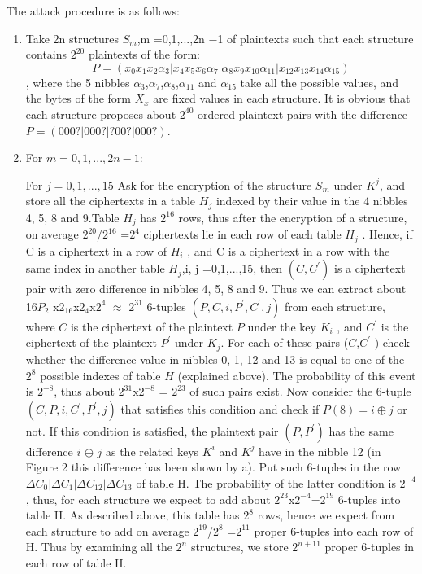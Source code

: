 \documentclass{transcrypto}
\begin{document}
	The attack procedure is as follows:
	\begin{enumerate}
		
	
	\item Take 2n structures $S_m$,m =0,1,...,2n −1 of plaintexts such that each structure contains $2^{20}$ plaintexts of the form: $$P =(x_0x_1x_2 \alpha _3|x_4x_5x_6\alpha _7|\alpha _8x_9x_{10}\alpha _{11}|x_{12}x_{13}x_{14}\alpha _{15})$$, where the 5 nibbles $\alpha_3$,$\alpha_7$,$\alpha_8$,$\alpha_{11}$ and $\alpha_{15}$ take all the possible values, and the bytes of the form $X_x$ are fixed values in each structure. It is obvious that each structure proposes about $2^{40}$ ordered plaintext pairs with the difference $P =(000?|000?|?00?|000?)$.
	\item For $m = 0,1,...,2n -1$: 
	
	For $j =0,1,...,15$ Ask for the encryption of the structure $S_m$ under $K^j$, and store all the ciphertexts in a table $H_j$ indexed by their value in the 4 nibbles 4, 5, 8 and 9.Table $H_j$ has $2^{16}$ rows, thus after the encryption of a structure, on average $2^{20}$/$2^{16}$ =$2^4$ ciphertexts lie in each row of each table $H_j$ . Hence, if C is a ciphertext in a row of $H_i$ , and C is a ciphertext in a row with the same index in another table $H_j$,i, j =0,1,...,15, then $(C,C^{'})$ is a ciphertext pair with zero difference in nibbles 4, 5, 8 and 9. Thus we can extract about 16$P_2$ x$2_{16}$x$2_4$x$2^4$ $\approx$ $2^{31}$ 6-tuples $(P, C, i, P^{'}, C^{'}, j)$ from each structure, where $C$ is the ciphertext of the plaintext $P$ under the key $K_i$ , and $C^{'}$ is the ciphertext of the plaintext $P^{'}$ under $K_j$. For each of these pairs ($C$,$C^{'}$ ) check whether the difference value in nibbles 0, 1, 12 and 13 is equal to one of the $2^8$ possible indexes of table $H$ (explained above). The probability of this event is $2^{-8}$, thus about $2^31$x$2^{−8}$ = $2^{23}$ of such pairs exist. Now consider the 6-tuple $(C, P, i, C^{'}, P^{'}, j)$ that satisfies this condition and check if $P(8) =i \oplus j$ or not. If this condition is satisfied, the plaintext pair $(P, P^{'})$ has the same difference $i$ $\oplus$ $j$ as the related keys $K^i$ and $K^j$ have in the nibble 12 (in Figure 2 this difference has been shown by a). Put such 6-tuples in the row $\Delta C_0|\Delta C_1|\Delta C_{12}|\Delta C_{13}$ of table H. The probability of the latter condition is $2^{-4}$, thus, for each structure we expect to add about $2^{23}$x$2^{-4}$=$2^{19}$ 6-tuples into table H. As described above, this table has $2^8$ rows, hence we expect from each structure to add on average $2^{19}$/$2^8$ =$2^{11}$ proper 6-tuples into each row of H. Thus by examining all the $2^n$ structures, we store $2^{n+11}$ proper 6-tuples in each row of table H. 

\end{enumerate}
\end{document}
